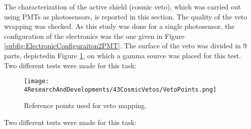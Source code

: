 The characterization of the active shield (cosmic veto), which was carried out using PMTs as photosensors, is reported in this section. The quality of the veto wrapping was checked. As this study was done for a single photosensor, the configuration of the electronics was the one given in Figure \ref{subfig:ElectronicConfiguraiton2PMT}. The surface of the veto was divided in 9 parts, depictedin Figure \ref{fig:MappingPoints}, on which a gamma source was placed for this test. Two different tests were made for this task:

\begin{figure}[h]
\centering
\texttt{[image: 4ResearchAndDevelopments/43CosmicVetos/VetoPoints.png]}
\caption{Reference points used for veto mapping.\label{fig:MappingPoints}}
\end{figure}
Two different tests were made for this task:
